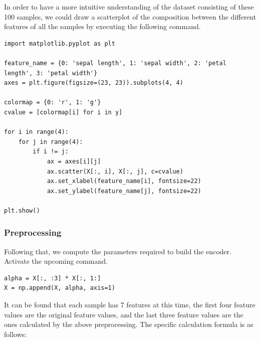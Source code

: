 In order to have a more intuitive understanding of the dataset consisting of these 100 samples, we could draw a scatterplot of the composition between the different features of all the samples by executing the following command.

\begin{lstlisting}
import matplotlib.pyplot as plt                                                           

feature_name = {0: 'sepal length', 1: 'sepal width', 2: 'petal length', 3: 'petal width'} 
axes = plt.figure(figsize=(23, 23)).subplots(4, 4)                                        

colormap = {0: 'r', 1: 'g'}                                                               
cvalue = [colormap[i] for i in y]                                                         

for i in range(4):
    for j in range(4):
        if i != j:
            ax = axes[i][j]                                                              
            ax.scatter(X[:, i], X[:, j], c=cvalue)                                        
            ax.set_xlabel(feature_name[i], fontsize=22)                                   
            ax.set_ylabel(feature_name[j], fontsize=22)                                   
            
plt.show()   
\end{lstlisting}



\subsubsection{Preprocessing}
Following that, we compute the parameters required to build the encoder.  Activate the upcoming command. 

\begin{lstlisting}
alpha = X[:, :3] * X[:, 1:]
X = np.append(X, alpha, axis=1)
\end{lstlisting}

It can be found that each sample has 7 features at this time, the first four feature values are the original feature values, and the last three feature values are the ones calculated by the above preprocessing. The specific calculation formula is as follows:

